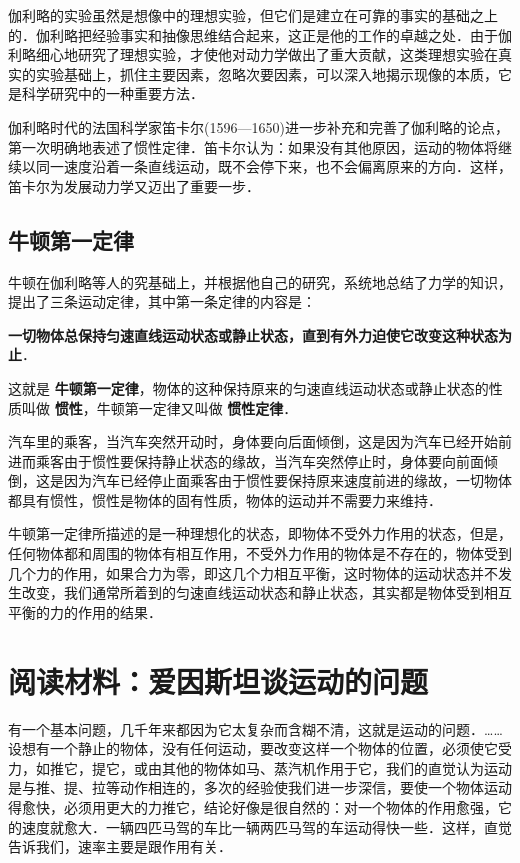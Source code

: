 伽利略的实验虽然是想像中的理想实验，但它们是建立在可靠的事实的基础之上的．伽利略把经验事实和抽像思维结合起来，这正是他的工作的卓越之处．由于伽利略细心地研究了理想实验，才使他对动力学做出了重大贡献，这类理想实验在真实的实验基础上，抓住主要因素，忽略次要因素，可以深入地揭示现像的本质，它是科学研究中的一种重要方法．

伽利略时代的法国科学家笛卡尔(1596—1650)进一步补充和完善了伽利略的论点，第一次明确地表述了惯性定律．笛卡尔认为：如果没有其他原因，运动的物体将继续以同一速度沿着一条直线运动，既不会停下来，也不会偏离原来的方向．这样，笛卡尔为发展动力学又迈出了重要一步．

\subsection{牛顿第一定律}
牛顿在伽利略等人的究基础上，并根据他自己的研究，系统地总结了力学的知识，提出了三条运动定律，其中第一条定律的内容是：

\textbf{ 一切物体总保持匀速直线运动状态或静止状态，直到有外力迫使它改变这种状态为止}．

这就是\textbf{ 牛顿第一定律}，物体的这种保持原来的匀速直线运动状态或静止状态的性质叫做\textbf{ 惯性}，牛顿第一定律又叫做\textbf{ 惯性定律}．

汽车里的乘客，当汽车突然开动时，身体要向后面倾倒，这是因为汽车已经开始前进而乘客由于惯性要保持静止状态的缘故，当汽车突然停止时，身体要向前面倾倒，这是因为汽车已经停止面乘客由于惯性要保持原来速度前进的缘故，一切物体都具有惯性，惯性是物体的固有性质，物体的运动并不需要力来维持．

牛顿第一定律所描述的是一种理想化的状态，即物体不受外力作用的状态，但是，任何物体都和周围的物体有相互作用，不受外力作用的物体是不存在的，物体受到几个力的作用，如果合力为零，即这几个力相互平衡，这时物体的运动状态并不发生改变，我们通常所着到的匀速直线运动状态和静止状态，其实都是物体受到相互平衡的力的作用的结果．

\section*{阅读材料：爱因斯坦谈运动的问题}
有一个基本问题，几千年来都因为它太复杂而含糊不清，这就是运动的问题．……设想有一个静止的物体，没有任何运动，要改变这样一个物体的位置，必须使它受力，如推它，提它，或由其他的物体如马、蒸汽机作用于它，我们的直觉认为运动是与推、提、拉等动作相连的，多次的经验使我们进一步深信，要使一个物体运动得愈快，必须用更大的力推它，结论好像是很自然的：对一个物体的作用愈强，它的速度就愈大．一辆四匹马驾的车比一辆两匹马驾的车运动得快一些．这样，直觉告诉我们，速率主要是跟作用有关．


